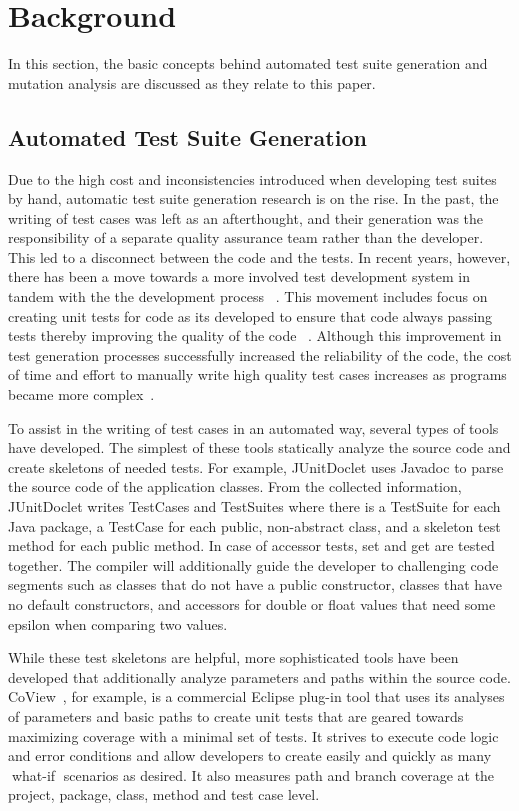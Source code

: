 \section{Background}
\label{sec:background}
In this section, the basic concepts behind automated test suite generation and mutation analysis are discussed as they relate to this paper.

\subsection{Automated Test Suite Generation}
Due to the high cost and inconsistencies introduced when developing test suites by hand, automatic test suite generation research is on the rise.  In the past, the writing of test cases was left as an afterthought, and their generation was the responsibility of a separate quality assurance team rather than the developer.  This led to a disconnect between the code and the tests.  In recent years, however, there has been a move towards a more involved test development system in tandem with the the development process ~\cite{Gelperin:1988:GST:62959.62965}.  This movement includes focus on creating unit tests for code as its developed to ensure that code always passing tests thereby improving the quality of the code ~\cite{Canfora:2006:EAT:1159733.1159788}.  Although this improvement in test generation processes successfully increased the reliability of the code, the cost of time and effort to manually write high quality test cases increases as programs became more complex~\cite{clarke1998automated}. 

To assist in the writing of test cases in an automated way, several types of tools have developed.  The simplest of these tools statically analyze the source code and create skeletons of  needed tests.  For example, JUnitDoclet \cite{JUnitDoclet} uses Javadoc to parse the source code of the application classes. From the collected information, JUnitDoclet writes TestCases and TestSuites where there is a TestSuite for each Java package, a TestCase for each public, non-abstract class, and a skeleton test method for each public method. In case of accessor tests, set and get are tested together.  The compiler will additionally guide the developer to challenging code segments such as classes that do not have a public constructor, classes that have no default constructors, and accessors for double or float values that need some epsilon when comparing two values.

While these test skeletons are helpful, more sophisticated tools have been developed that additionally analyze parameters and paths within the source code.  CoView~\cite{CoView}, for example, is a commercial Eclipse plug-in tool that uses its analyses of parameters and basic paths to create unit tests that are geared towards maximizing coverage with a minimal set of tests.  It strives to execute code logic and error conditions and allow developers to create easily and quickly as many what-if scenarios as desired. It also measures path and branch coverage at the project, package, class, method and test case level. 

